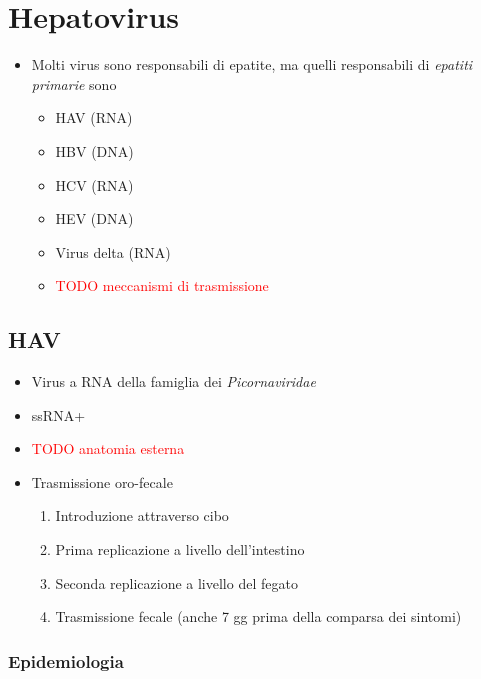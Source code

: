 \documentclass[italian,]{article}
\providecommand{\tightlist}{%
  \setlength{\itemsep}{0pt}\setlength{\parskip}{0pt}}
\newcommand{\TODO}[1]{\textcolor{red}{\textsf{\footnotesize{TODO #1}}}} %
\begin{document}
\hypertarget{hepatovirus}{%
\section{Hepatovirus}\label{hepatovirus}}

\begin{itemize}
\tightlist
\item
  Molti virus sono responsabili di epatite, ma quelli responsabili di
  \emph{epatiti primarie} sono

  \begin{itemize}
  \item
    HAV (RNA)
  \item
    HBV (DNA)
  \item
    HCV (RNA)
  \item
    HEV (DNA)
  \item
    Virus delta (RNA)
  \item
    \TODO{meccanismi di trasmissione}
  \end{itemize}
\end{itemize}

\hypertarget{hav}{%
\subsection{HAV}\label{hav}}

\begin{itemize}
\item
  Virus a RNA della famiglia dei \emph{Picornaviridae}
\item
  ssRNA+
\item
  \TODO{anatomia esterna}
\item
  Trasmissione oro-fecale

  \begin{enumerate}
  \def\labelenumi{\arabic{enumi}.}
  \tightlist
  \item
    Introduzione attraverso cibo
  \item
    Prima replicazione a livello dell'intestino
  \item
    Seconda replicazione a livello del fegato
  \item
    Trasmissione fecale (anche 7 gg prima della comparsa dei sintomi)
  \end{enumerate}
\end{itemize}

\hypertarget{epidemiologia-5}{%
\subsubsection{Epidemiologia}\label{epidemiologia-5}}
\end{document}
